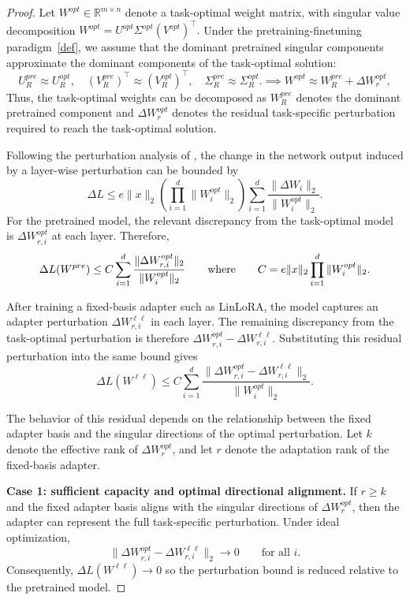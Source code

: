 \documentclass{article}
\begin{document}
\begin{proof}
Let $W^{opt} \in \mathbb{R}^{m \times n}$ denote a task-optimal weight matrix, with singular value decomposition
$W^{opt} = U^{opt}\Sigma^{opt}(V^{opt})^\top.$
Under the pretraining-finetuning paradigm~\ref{def}, we assume that the dominant pretrained singular components approximate the dominant components of the task-optimal solution:
\[
U_R^{pre} \approx U_R^{opt}, \quad
(V_R^{pre})^\top \approx (V_R^{opt})^\top,
\quad
\Sigma_R^{pre} \approx \Sigma_R^{opt}.
\implies
W^{opt} \approx W_R^{pre} + \Delta W_r^{opt},
\]
Thus, the task-optimal weights can be decomposed as $W_R^{pre}$ denotes the dominant pretrained component and $\Delta W_r^{opt}$ denotes the residual task-specific perturbation required to reach the task-optimal solution.

Following the perturbation analysis of \citet{neyshabur2018pacbayesian}, the change in the network output induced by a layer-wise perturbation can be bounded by
\[
\Delta L
\leq
e \|x\|_2
\left(
\prod_{i=1}^{d} \|W_i^{opt}\|_2
\right)
\sum_{i=1}^{d}
\frac{\|\Delta W_i\|_2}{\|W_i^{opt}\|_2}.
\]
For the pretrained model, the relevant discrepancy from the task-optimal model is $\Delta W_{r,i}^{opt}$ at each layer. Therefore,
\[
\Delta L(W^{pre})
\leq
C
\sum_{i=1}^{d}
\frac{\|\Delta W_{r,i}^{opt}\|_2}{\|W_i^{opt}\|_2}
\text{\qquad where\qquad }
C
=
e \|x\|_2
\prod_{i=1}^{d}
\|W_i^{opt}\|_2.
\]

After training a fixed-basis adapter such as LinLoRA, the model captures an adapter perturbation $\Delta W_{r,i}^{\ell \ell}$ in each layer. The remaining discrepancy from the task-optimal perturbation is therefore
$\Delta W_{r,i}^{opt} - \Delta W_{r,i}^{\ell \ell}.$ 
Substituting this residual perturbation into the same bound gives
\[
\Delta L(W^{\ell \ell})
\leq
C
\sum_{i=1}^{d}
\frac{\|\Delta W_{r,i}^{opt} - \Delta W_{r,i}^{\ell \ell}\|_2}{\|W_i^{opt}\|_2}.
\]

The behavior of this residual depends on the relationship between the fixed adapter basis and the singular directions of the optimal perturbation. Let $k$ denote the effective rank of $\Delta W_r^{opt}$, and let $r$ denote the adaptation rank of the fixed-basis adapter.

\textbf{Case 1: sufficient capacity and optimal directional alignment.} If $r \geq k$ and the fixed adapter basis aligns with the singular directions of $\Delta W_r^{opt}$, then the adapter can represent the full task-specific perturbation. Under ideal optimization,
\[
\|\Delta W_{r,i}^{opt} - \Delta W_{r,i}^{\ell \ell}\|_2
\to
0
\qquad
\text{for all } i.
\]
Consequently, $\Delta L(W^{\ell \ell}) \to 0$
so the perturbation bound is reduced relative to the pretrained model.


\end{proof}
\end{document}
